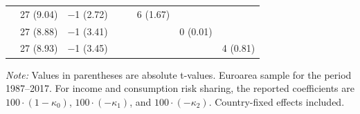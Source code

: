 \begin{table}[!htbp]
{\begin{tabular}{lccccccc}
& 27 (9.04) 
& $-$1 (2.72) 
& 
& 
& 6 (1.67) 
& 
& \\

& 27 (8.88) 
& $-$1 (3.41) 
& 
& 
& 
& 0 (0.01) 
& \\

& 27 (8.93) 
& $-$1 (3.45) 
& 
& 
& 
& 
& 4 (0.81) \\

\hline 
\hline
\end{tabular}%
}

\vspace{0.15cm}

\begin{minipage}{\linewidth}
\footnotesize
\textit{Note:} Values in parentheses are absolute t-values. Euroarea sample for the period 1987--2017. For income and consumption risk sharing, the reported coefficients are \(100 \cdot (1-\kappa_0)\), \(100 \cdot (-\kappa_1)\), and \(100 \cdot (-\kappa_2)\). Country-fixed effects included.
\end{minipage}
\end{table}